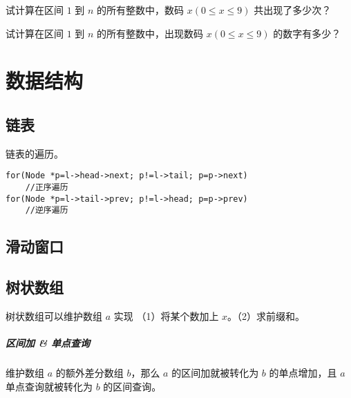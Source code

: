 \documentclass{probook}
\begin{document}
\begin{multicols}{2}
试计算在区间 $1$ 到 $n$ 的所有整数中，数码 $x(0 \leqslant x \leqslant 9)$ 共出现了多少次？



试计算在区间 $1$ 到 $n$ 的所有整数中，出现数码 $x(0 \leqslant x \leqslant 9)$ 的数字有多少？









\chapter{数据结构}

\section{链表}



链表的遍历。

\begin{lstlisting}[style=cpp]
for(Node *p=l->head->next; p!=l->tail; p=p->next)
    //正序遍历
for(Node *p=l->tail->prev; p!=l->head; p=p->prev)
    //逆序遍历
\end{lstlisting}

\section{滑动窗口}



\section{树状数组}

树状数组可以维护数组 $a$ 实现 （1）将某个数加上 $x$。（2）求前缀和。



\paragraph{区间加 \& 单点查询}

维护数组 $a$ 的额外差分数组 $b$，那么 $a$ 的区间加就被转化为 $b$ 的单点增加，且 $a$ 单点查询就被转化为 $b$ 的区间查询。


\end{multicols}
\end{document}
